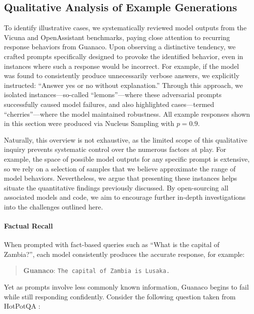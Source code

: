 \subsection{Qualitative Analysis of Example Generations}
\label{ssec:examples}

To identify illustrative cases, we systematically reviewed model outputs from the Vicuna and OpenAssistant benchmarks, paying close attention to recurring response behaviors from {Guanaco}. Upon observing a distinctive tendency, we crafted prompts specifically designed to provoke the identified behavior, even in instances where such a response would be incorrect. For example, if the model was found to consistently produce unnecessarily verbose answers, we explicitly instructed: ``Answer yes or no without explanation.'' Through this approach, we isolated instances—so-called ``lemons''—where these adversarial prompts successfully caused model failures, and also highlighted cases—termed ``cherries''—where the model maintained robustness. All example responses shown in this section were produced via Nucleus Sampling \cite{holtzmancurious} with $p=0.9$.

Naturally, this overview is not exhaustive, as the limited scope of this qualitative inquiry prevents systematic control over the numerous factors at play. For example, the space of possible model outputs for any specific prompt is extensive, so we rely on a selection of samples that we believe approximate the range of model behaviors. Nevertheless, we argue that presenting these instances helps situate the quantitative findings previously discussed. By open-sourcing all associated models and code, we aim to encourage further in-depth investigations into the challenges outlined here.

\paragraph{Factual Recall} When prompted with fact-based queries such as ``What is the capital of Zambia?'', each model consistently produces the accurate response, for example:

\begin{quote}
    \textbf{Guanaco}:
    \texttt{The capital of Zambia is Lusaka.}
\end{quote}

Yet as prompts involve less commonly known information, {Guanaco} begins to fail while still responding confidently. Consider the following question taken from HotPotQA \citep{yang2018hotpotqa}:

